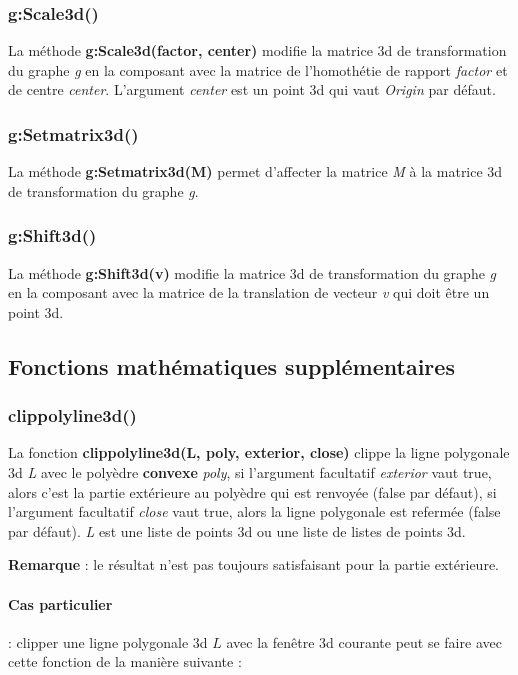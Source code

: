 \subsubsection{g:Scale3d()}
La méthode \textbf{g:Scale3d(factor, center)} modifie la matrice 3d de transformation du graphe \emph g en la composant avec la matrice de l'homothétie de rapport \emph{factor} et de centre \emph{center}. L'argument \emph{center} est un point 3d qui vaut \emph{Origin} par défaut.


\subsubsection{g:Setmatrix3d()}
La méthode \textbf{g:Setmatrix3d(M)} permet d'affecter la matrice \emph M à la matrice 3d de transformation du graphe \emph g.

\subsubsection{g:Shift3d()}
La méthode \textbf{g:Shift3d(v)} modifie la matrice 3d de transformation du graphe \emph g en la composant avec la matrice de la translation de vecteur \emph{v} qui doit être un point 3d.

\subsection{Fonctions mathématiques supplémentaires}

\subsubsection{clippolyline3d()}
La fonction \textbf{clippolyline3d(L, poly, exterior, close)} clippe la ligne polygonale 3d \emph{L} avec le polyèdre \textbf{convexe} \emph{poly}, si l'argument facultatif \emph{exterior} vaut true, alors c'est la partie extérieure au polyèdre qui est renvoyée (false par défaut), si l'argument facultatif \emph{close} vaut true, alors la ligne polygonale est refermée (false par défaut). \emph{L} est une liste de points 3d ou une liste de listes de points 3d.\par
\textbf{Remarque} : le résultat n'est pas toujours satisfaisant pour la partie extérieure.

\paragraph{Cas particulier} : clipper une ligne polygonale 3d $L$ avec la fenêtre 3d courante peut se faire avec cette fonction de la manière suivante :

